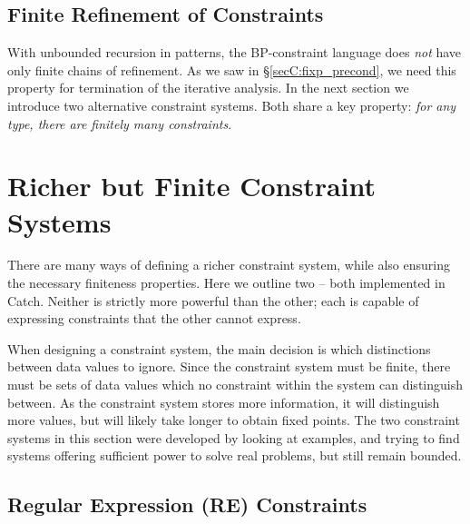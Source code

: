 \subsection{Finite Refinement of Constraints}
\label{secC:bounded}

With unbounded recursion in patterns, the BP-constraint language does \textit{not} have only finite chains of refinement. As we saw in \S\ref{secC:fixp_precond}, we need this property for termination of the iterative analysis. In the next section we introduce two alternative constraint systems. Both share a key property: \textit{for any type, there are finitely many constraints}.


\section{Richer but Finite Constraint Systems}
\label{secC:constraint}

There are many ways of defining a richer constraint system, while also ensuring the necessary finiteness properties. Here we outline two -- both implemented in Catch. Neither is strictly more powerful than the other; each is capable of expressing constraints that the other cannot express.

When designing a constraint system, the main decision is which distinctions between data values to ignore. Since the constraint system must be finite, there must be sets of data values which no constraint within the system can distinguish between. As the constraint system stores more information, it will distinguish more values, but will likely take longer to obtain fixed points. The two constraint systems in this section were developed by looking at examples, and trying to find systems offering sufficient power to solve real problems, but still remain bounded.

\subsection{Regular Expression (RE) Constraints}
\label{secC:regexp}


